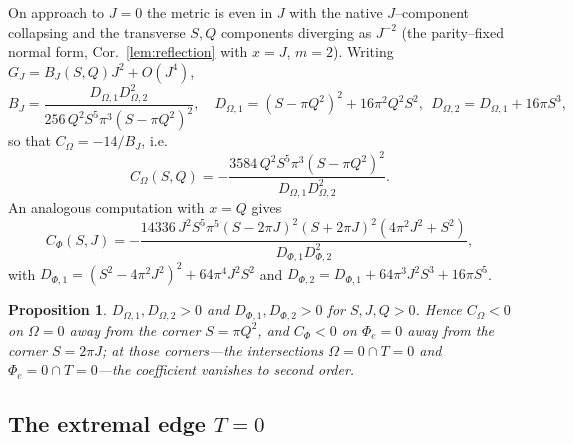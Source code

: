 \documentclass[11pt]{article}
\newtheorem{proposition}[theorem]{Proposition}
\begin{document}
On approach to $J=0$ the metric is even in $J$ with the native $J$--component collapsing and the
transverse $S,Q$ components diverging as $J^{-2}$ (the parity--fixed normal form,
Cor.~\ref{lem:reflection} with $x=J$, $m=2$). Writing $G_J=B_J(S,Q)J^2+O(J^4)$,
\begin{equation}
B_J=\frac{D_{\Omega,1}D_{\Omega,2}^2}{256\,Q^2S^5\pi^3(S-\pi Q^2)^2},\quad
D_{\Omega,1}=(S-\pi Q^2)^2+16\pi^2Q^2S^2,\ \ D_{\Omega,2}=D_{\Omega,1}+16\pi S^3,
\end{equation}
so that $C_\Omega=-14/B_J$, i.e.
\begin{equation}
C_\Omega(S,Q)=-\frac{3584\,Q^2S^5\pi^3(S-\pi Q^2)^2}{D_{\Omega,1}D_{\Omega,2}^2}.
\label{eq:COmega}
\end{equation}
An analogous computation with $x=Q$ gives
\begin{equation}
C_\Phi(S,J)=-\frac{14336\,J^2S^5\pi^5(S-2\pi J)^2(S+2\pi J)^2(4\pi^2J^2+S^2)}
{D_{\Phi,1}D_{\Phi,2}^2},
\label{eq:CPhi}
\end{equation}
with $D_{\Phi,1}=(S^2-4\pi^2J^2)^2+64\pi^4J^2S^2$ and $D_{\Phi,2}=D_{\Phi,1}+64\pi^3J^2S^3
+16\pi S^5$.

\begin{proposition}
$D_{\Omega,1},D_{\Omega,2}>0$ and $D_{\Phi,1},D_{\Phi,2}>0$ for $S,J,Q>0$. Hence $C_\Omega<0$ on
$\Omega=0$ away from the corner $S=\pi Q^2$, and $C_\Phi<0$ on $\Phi_e=0$ away from the corner
$S=2\pi J$; at those corners---the intersections $\Omega=0\cap T=0$ and $\Phi_e=0\cap T=0$---the
coefficient vanishes to second order.
\end{proposition}

\subsection{The extremal edge \texorpdfstring{$T=0$}{T=0}}
\label{sec:extremal}
\end{document}

